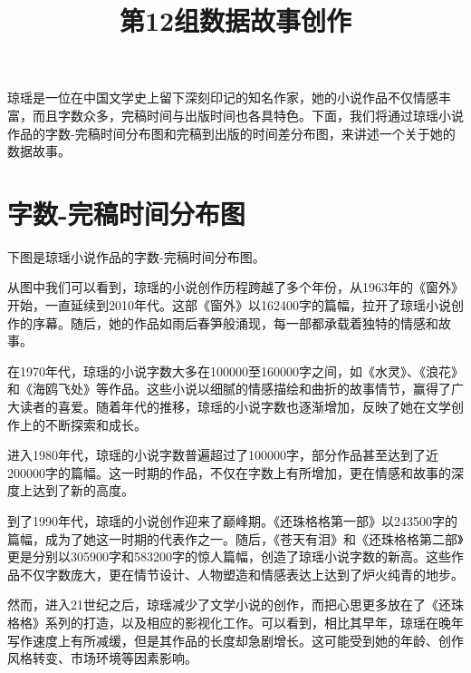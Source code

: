 \documentclass{article}
\begin{document}
\title{第12组数据故事创作}
\maketitle						%


琼瑶是一位在中国文学史上留下深刻印记的知名作家，她的小说作品不仅情感丰富，而且字数众多，完稿时间与出版时间也各具特色。下面，我们将通过琼瑶小说作品的字数-完稿时间分布图和完稿到出版的时间差分布图，来讲述一个关于她的数据故事。

\section{字数-完稿时间分布图}

下图是琼瑶小说作品的字数-完稿时间分布图。

从图中我们可以看到，琼瑶的小说创作历程跨越了多个年份，从1963年的《窗外》开始，一直延续到2010年代。这部《窗外》以162400字的篇幅，拉开了琼瑶小说创作的序幕。随后，她的作品如雨后春笋般涌现，每一部都承载着独特的情感和故事。

在1970年代，琼瑶的小说字数大多在100000至160000字之间，如《水灵》、《浪花》和《海鸥飞处》等作品。这些小说以细腻的情感描绘和曲折的故事情节，赢得了广大读者的喜爱。随着年代的推移，琼瑶的小说字数也逐渐增加，反映了她在文学创作上的不断探索和成长。

进入1980年代，琼瑶的小说字数普遍超过了100000字，部分作品甚至达到了近200000字的篇幅。这一时期的作品，不仅在字数上有所增加，更在情感和故事的深度上达到了新的高度。

到了1990年代，琼瑶的小说创作迎来了巅峰期。《还珠格格第一部》以243500字的篇幅，成为了她这一时期的代表作之一。随后，《苍天有泪》和《还珠格格第二部》更是分别以305900字和583200字的惊人篇幅，创造了琼瑶小说字数的新高。这些作品不仅字数庞大，更在情节设计、人物塑造和情感表达上达到了炉火纯青的地步。

然而，进入21世纪之后，琼瑶减少了文学小说的创作，而把心思更多放在了《还珠格格》系列的打造，以及相应的影视化工作。可以看到，相比其早年，琼瑶在晚年写作速度上有所减缓，但是其作品的长度却急剧增长。这可能受到她的年龄、创作风格转变、市场环境等因素影响。
\end{document}
